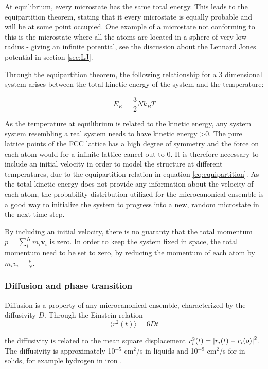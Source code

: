 At equilibrium, every microstate has the same total energy. This leads to  the equipartition theorem, stating that it every microstate is equally probable and will be at some point occupied. One example of a microstate not conforming to this is the microstate where all the atoms are located in a sphere of very low radius - giving an infinite potential, see the discussion about the Lennard Jones potential in section \ref{sec:LJ}. 

Through the equipartition theorem, the following relationship for a 3 dimensional system arises between the total kinetic energy of the system and the temperature:

\begin{equation}\label{eq:equipartition}
E_K = \frac{3	}{2}Nk_BT
\end{equation}

As the temperature at equilibrium is related to the kinetic energy, any system system resembling a real system needs to have kinetic energy >0. The pure lattice points of the FCC lattice has a high degree of symmetry and the force on each atom would for a infinite lattice cancel out to 0. It is therefore necessary to include an initial velocity in order to model the structure at different temperatures, due to the equipartition relation in equation \ref{eq:equipartition}. As the total kinetic energy does not provide any information about the velocity of each atom, the probability distribution utilized for the microcanonical ensemble is a good way to initialize the system to progress into a new, random microstate in the next time step. 

By including an initial velocity, there is no guaranty that the total momentum $ p = \sum\limits_{i}^{N} m_i\textbf{v}_i $ is zero. In order to keep the system fixed in space, the total momentum need to be set to zero, by reducing the momentum of each atom by $ m_iv_i - \frac{p}{N}$. 

\subsubsection{Diffusion and phase transition}
Diffusion is a property of any microcanonical ensemble, characterized by the diffusivity $ D $. Through the Einstein relation
\begin{equation}\label{eq:Einstein}
\langle r^2(t) \rangle = 6Dt
\end{equation}

the diffusivity is related to the mean square displacement $ r_i^2(t) = \abs{r_i(t) - r_i(o)}^2 $. The diffusivity is approximately 10$^{-5}$ cm$^2$/s in liquids and 10$^{-9}$ cm$^2$/s for in solids, for example hydrogen in iron \cite{wiki_diff}. 

